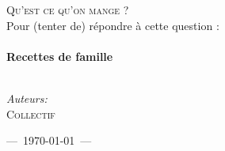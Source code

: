 \begin{titlepage}

\begin{center}


  

\textsc{\LARGE Qu'est ce qu'on mange ?}\\[1.0cm]


\large Pour {\small(tenter de)} répondre à cette question :\\[0.5cm]


\HRule \\[0.8cm]
{ \Huge \bfseries Recettes de famille}\\[0.4cm]

\HRule \\[1.5cm]

\begin{minipage}{0.4\textwidth}
\begin{center}

\large
\emph{Auteurs:}\\
\textsc{Collectif}
\end{center}
\end{minipage}


\vfill

{\large ---~\today~---}

\end{center}

\end{titlepage}